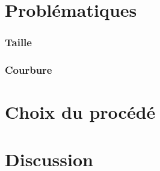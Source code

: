 \label{sec:Theme3}

\section{Problématiques}

\subsubsection{Taille}

\subsubsection{Courbure}


\section{Choix du procédé}


\section{Discussion}

